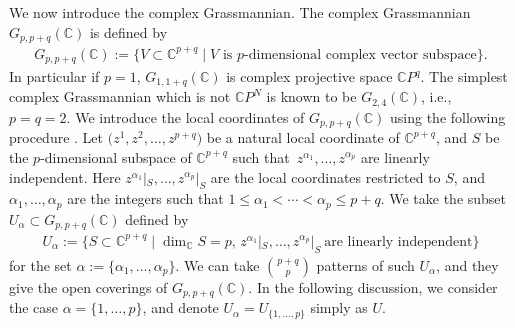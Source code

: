 \documentclass[pdftex]{sigma}
\numberwithin{equation}{section}
\begin{document}
We now introduce the complex Grassmannian. The complex Grassmannian $G_{p,p+q}(\mathbb{C})$ is defined by
\begin{align*}
 G_{p,p+q}(\mathbb{C})
 :=
\bigl\{ V \subset \mathbb{C}^{p+q} \mid V \mbox{ is $p$-dimensional complex vector subspace}
\bigr\}.
\end{align*}
In particular if $p=1$, $G_{1,1+q}(\mathbb{C})$ is complex projective space $\mathbb{C}P^{q}$. The simplest complex Grassmannian which is not $\mathbb{C}P^{N}$ is known to be $G_{2,4}(\mathbb{C})$, i.e., $p=q=2$.
We introduce the local coordinates of $G_{p,p+q}(\mathbb{C})$ using the following procedure \cite{KN}. Let $\bigl(z^{1}, z^{2} ,\dots ,z^{p+q}\bigr)$ be a natural local coordinate of $\mathbb{C}^{p+q}$, and $S$ be the $p$-dimensional subspace of $\mathbb{C}^{p+q}$ such that~${z^{\alpha_{1}},\dots, z^{\alpha_{p}}}$ are linearly independent. Here $z^{\alpha_{1}}|_{S},\dots, z^{\alpha_{p}}|_{S}$ are the local coordinates restricted to $S$, and~${\alpha_{1},\dots, \alpha_{p}}$ are the integers such that $1\leq\alpha_{1}<\cdots<\alpha_{p}\leq p+q$. We take the subset $U_{\alpha}\subset G_{p,p+q}(\mathbb{C})$ defined by
\begin{align*}
U_{\alpha}
:=
\{
S
\subset
\mathbb{C}^{p+q}
\mid
\dim\nolimits_{\mathbb{C}}S
=
p,\,
z^{\alpha_{1}}|_{S},\dots, z^{\alpha_{p}}|_{S}
\ \text{are linearly independent}
\}
\end{align*}
for the set $\alpha:=\{\alpha_{1},\dots, \alpha_{p}\}$. We can take $\binom{p+q}{p}$ patterns of such $U_{\alpha}$, and they give the open coverings of $G_{p,p+q}(\mathbb{C})$. In the following discussion, we consider the case $\alpha=\{1,\dots,p\}$, and denote $U_{\alpha}=U_{\{1,\dots,p\}}$ simply as $U$.
\end{document}

